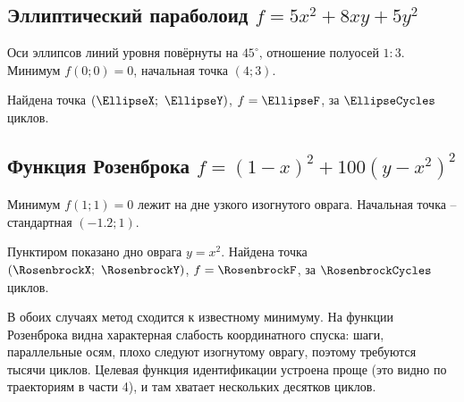         \subsection*{Эллиптический параболоид $f = 5x^2 + 8xy + 5y^2$}
            Оси эллипсов линий уровня повёрнуты на $45^\circ$, отношение полуосей $1:3$. Минимум $f(0;0) = 0$, начальная точка $(4;3)$.
            \begin{center}
            \end{center}
            Найдена точка $(\EllipseX;\ \EllipseY)$, $f = \EllipseF$, за $\EllipseCycles$ циклов.

        \subsection*{Функция Розенброка $f = (1 - x)^2 + 100(y - x^2)^2$}
            Минимум $f(1;1) = 0$ лежит на дне узкого изогнутого оврага. Начальная точка -- стандартная $(-1.2;1)$.
            \begin{center}
            \end{center}
            Пунктиром показано дно оврага $y = x^2$. Найдена точка $(\RosenbrockX;\ \RosenbrockY)$, $f = \RosenbrockF$, за $\RosenbrockCycles$ циклов.

        В обоих случаях метод сходится к известному минимуму. На функции Розенброка видна характерная слабость координатного спуска: шаги, параллельные осям, плохо следуют изогнутому оврагу, поэтому требуются тысячи циклов. Целевая функция идентификации устроена проще (это видно по траекториям в части 4), и там хватает нескольких десятков циклов.
